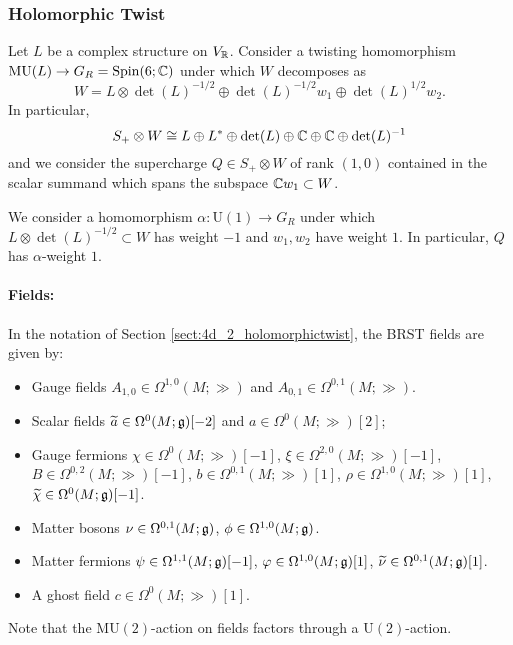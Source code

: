 \documentclass[10pt, oneside]{article}
\newcommand{\MU}{\mathrm{MU}}
\renewcommand{\U}{\mathrm{U}}
\begin{document}
\subsubsection{Holomorphic Twist}
\label{sect:4d4holomorphictwist}

Let $L$ be a complex structure on $V_\RR$. Consider a twisting homomorphism $\MU(L)\rightarrow G_R=\Spin(6; \CC)$ under which $W$ decomposes as
\[W = L\otimes \det(L)^{-1/2}\oplus \det(L)^{-1/2} w_1\oplus \det(L)^{1/2} w_2.\]
In particular,
\[S_+\otimes W\cong L\oplus L^*\oplus \det(L)\oplus \CC \oplus \CC\oplus \det(L)^{-1}\]
and we consider the supercharge $Q\in S_+\otimes W$ of rank $(1, 0)$ contained in the scalar summand which spans the subspace $\CC w_1\subset W$.

We consider a homomorphism $\alpha\colon \U(1)\rightarrow G_R$ under which $L\otimes \det(L)^{-1/2}\subset W$ has weight $-1$ and $w_1,w_2$ have weight $1$. In particular, $Q$ has $\alpha$-weight $1$.

\vspace{-10pt}
\paragraph{Fields:} In the notation of Section \ref{sect:4d_2_holomorphictwist}, the BRST fields are given by:
\begin{itemize}
\item Gauge fields $A_{1, 0}\in\Omega^{1, 0}(M; \gg)$ and $A_{0, 1}\in\Omega^{0, 1}(M; \gg)$.
\item Scalar fields $\Tilde{a} \in \Omega^{0}(M; \gg)[-2]$ and $a \in\Omega^{0}(M; \gg)[2]$;
\item Gauge fermions $\chi \in \Omega^0(M ; \gg)[-1]$, $\xi \in \Omega^{2,0}(M ; \gg)[-1]$, $B \in \Omega^{0,2}(M ; \gg)[-1]$, $b \in \Omega^{0,1}(M ; \gg)[1]$, $\rho \in \Omega^{1,0}(M ; \gg)[1]$,  $\Tilde{\chi} \in \Omega^0(M ; \gg)[-1]$.
\item Matter bosons $\nu\in\Omega^{0, 1}(M; \fg)$, $\phi\in\Omega^{1,0}(M; \fg)$.
\item Matter fermions $\psi \in \Omega^{1,1} (M;  \fg)[-1]$, $\varphi \in \Omega^{1,0} (M ; \fg)[1]$, $\Tilde{\nu} \in \Omega^{0,1}(M; \fg)[1]$.
\item A ghost field $c\in \Omega^0(M; \gg)[1]$.
\end{itemize}

Note that the $\MU(2)$-action on fields factors through a $\U(2)$-action.
\end{document}
